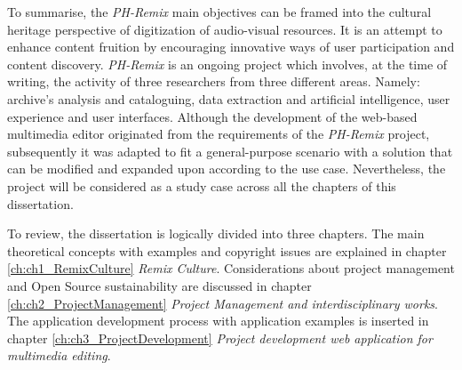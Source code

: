 To summarise, the \emph{PH-Remix} main objectives can be framed into the cultural heritage perspective of digitization of audio-visual resources. It is an attempt to enhance content fruition by encouraging innovative ways of user participation and content discovery. \emph{PH-Remix} is an ongoing project which involves, at the time of writing, the activity of three researchers from three different areas. Namely: archive’s analysis and cataloguing, data extraction and artificial intelligence, user experience and user interfaces.
Although the development of the web-based multimedia editor originated from the requirements of the \emph{PH-Remix} project, subsequently it was adapted to fit a general-purpose scenario with a solution that can be modified and expanded upon according to the use case. Nevertheless, the project will be considered as a study case across all the chapters of this dissertation.

To review, the dissertation is logically divided into three chapters.
The main theoretical concepts with examples and copyright issues are explained in chapter \ref{ch:ch1_RemixCulture} \emph{Remix Culture}.
Considerations about project management and Open Source sustainability are discussed in chapter \ref{ch:ch2_ProjectManagement} \emph{Project Management and interdisciplinary works}.
The application development process with application examples is inserted in chapter \ref{ch:ch3_ProjectDevelopment} \emph{Project development web application for multimedia editing}.
